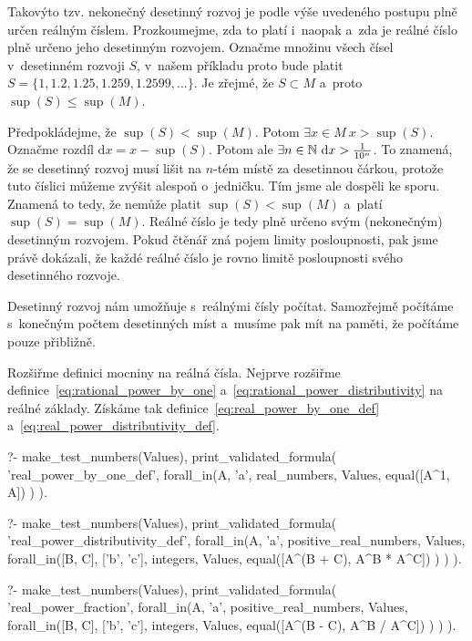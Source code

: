 Takovýto tzv. nekonečný desetinný rozvoj je podle výše uvedeného postupu plně určen reálným číslem. Prozkoumejme, zda to platí i~naopak a~zda je reálné číslo plně určeno jeho desetinným rozvojem. Označme množinu všech čísel v~desetinném rozvoji \(S\), v~našem příkladu proto bude platit \(S = \{1, 1.2, 1.25, 1.259, 1.2599, ...\}\). Je zřejmé, že \(S \subset M\) a~proto \(\sup(S) \leq \sup(M)\).

Předpokládejme, že \(\sup(S) < \sup(M)\). Potom \(\exists x \in M \ x > \sup(S)\). Označme rozdíl \(\mathrm{d}x = x - \sup(S)\). Potom ale \(\exists n \in \naturalnumbers \ \mathrm{d}x > \frac{1}{10^n}\). To znamená, že se desetinný rozvoj musí lišit na \(n\)-tém místě za desetinnou čárkou, protože tuto číslici můžeme zvýšit alespoň o~jedničku. Tím jsme ale dospěli ke sporu. Znamená to tedy, že nemůže platit \(\sup(S) < \sup(M)\) a~platí \(\sup(S) = \sup(M)\). Reálné číslo je tedy plně určeno svým (nekonečným) desetinným rozvojem. Pokud čtěnář zná pojem limity posloupnosti, pak jsme právě dokázali, že každé reálné číslo je rovno limitě posloupnosti svého desetinného rozvoje. 

Desetinný rozvoj nám umožňuje s~reálnými čísly počítat. Samozřejmě počítáme s~konečným počtem desetinných míst a~musíme pak mít na paměti, že počítáme pouze přibližně.

Rozšiřme definici mocniny na reálná čísla. Nejprve rozšiřme definice~\eqref{eq:rational_power_by_one} a~\eqref{eq:rational_power_distributivity} na reálné základy. Získáme tak definice~\eqref{eq:real_power_by_one_def} a~\eqref{eq:real_power_distributivity_def}.

\begin{fact}
\begin{prolog}
?-	make_test_numbers(Values),
	print_validated_formula(
		'real_power_by_one_def',
		forall_in(A, 'a', real_numbers, Values,
			equal([A^1, A])
		)
	).				
\end{prolog}
\begin{prolog}
?-	make_test_numbers(Values),
	print_validated_formula(
		'real_power_distributivity_def',
		forall_in(A, 'a', positive_real_numbers, Values,
			forall_in([B, C], ['b', 'c'], integers, Values,
				equal([A^(B + C), A^B * A^C])
			)
		)
	).				
\end{prolog}
\end{fact}

\begin{prolog}
?-	make_test_numbers(Values),
	print_validated_formula(
		'real_power_fraction',
		forall_in(A, 'a', positive_real_numbers, Values,
			forall_in([B, C], ['b', 'c'], integers, Values,
				equal([A^(B - C), A^B / A^C])
			)
		)
	).				
\end{prolog}

